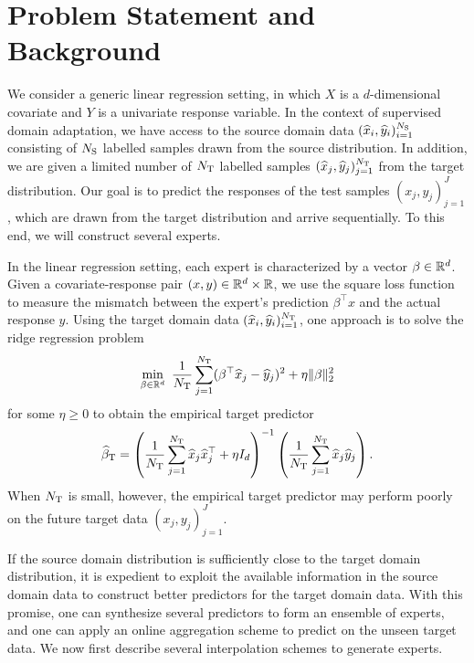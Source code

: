 \documentclass{article}
\begin{document}
\section{Problem Statement and Background}
\label{sec:problem}
We consider a generic linear regression setting, in which $X$ is a $d$-dimensional covariate and $Y$ is a univariate response variable. In the context of supervised domain adaptation, we have access to the source domain data $(\widehat x_i, \widehat y_i)_{i=1}^{N_{\rm S}}$ consisting of $N_{\rm S}$ labelled samples drawn from the source distribution. In addition, we are given a limited number of $N_{\rm T}$ labelled samples $(\widehat x_j, \widehat y_j)_{j=1}^{N_{\rm T}}$ from the target distribution. Our goal is to predict the responses of the test samples $(x_j, y_j)_{j=1}^J$, which are drawn from the target distribution and arrive sequentially. To this end, we will construct several experts. 


In the linear regression setting, each expert is characterized by a vector $\beta \in \mathbb{R}^d$. Given a covariate-response pair $(x, y) \in \mathbb{R}^d \times \mathbb{R}$, we use the square loss function to measure the mismatch between the expert's prediction $\beta^\top x$ and the actual response $y$. Using the target domain data $(\widehat x_i, \widehat y_i)_{i=1}^{N_{\rm T}}$, one approach is to solve the ridge regression problem
\[
    \min\limits_{\beta \in \mathbb{R}^d}~\frac{1}{N_{\rm T}} \sum_{j=1}^{N_{\rm T}} (\beta^\top \widehat x_j -  \widehat y_j)^2 + \eta \| \beta\|_2^2
\]
for some $\eta \ge 0$ to obtain the empirical target predictor
\[
    \widehat \beta_{\rm T} = \left( \frac{1}{N_{\rm T}} \sum_{j=1}^{N_{\rm T}} \widehat x_j \widehat x_j^\top + \eta I_d \right)^{-1} \left( \frac{1}{N_{\rm T}} \sum_{j=1}^{N_{\rm T}} \widehat x_j \widehat y_j \right).
\]
When $N_{\rm T}$ is small, however, the empirical target predictor may perform poorly on the future target data $(x_j, y_j)_{j=1}^J$. 


If the source domain distribution is sufficiently close to the target domain distribution, it is expedient to exploit the available information in the source domain data to construct better predictors for the target domain data. With this promise, one can synthesize several predictors to form an ensemble of experts, and one can apply an online aggregation scheme to predict on the unseen target data. We now first describe several interpolation schemes to generate experts.
\end{document}
